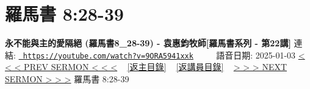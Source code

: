 \documentclass{book}
\begin{document}
\section{羅馬書 8:28-39}
\label{sec:9ORA5941xxk}
\textbf{永不能與主的愛隔絕 (羅馬書8\_28-39) - 袁惠鈞牧師[羅馬書系列 - 第22講]}
\newline
\newline
連結: \href{https://youtube.com/watch?v=9ORA5941xxk}{\texttt{ https://youtube.com/watch?v=9ORA5941xxk}} ~~~~ 語音日期: 2025-01-03 
\newline
\newline
\hyperref[sec:GqTOPwqfjwM]{< < < PREV SERMON < < <}
~
\hyperlink{toc}{[返主目錄]}
~
\hyperref[ch:preacher6]{[返講員目錄]}
~
\hyperref[sec:w_ajWsBZ9eQ]{> > > NEXT SERMON > > >}
\newline
\newline
羅馬書 8:28-39
\newline
\end{document}
